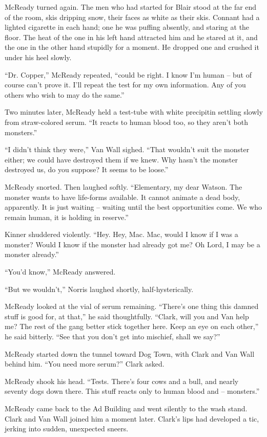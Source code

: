\documentclass[letterpaper,openany,12pt]{memoir}		%
\begin{document}
McReady turned again. The men who had started for Blair stood at the far end of
the room, skis dripping snow, their faces as white as their skis. Connant had a
lighted cigarette in each hand; one he was puffing absently, and staring at the
floor. The heat of the one in his left hand attracted him and he stared at it,
and the one in the other hand stupidly for a moment. He dropped one and crushed
it under his heel slowly.

``Dr. Copper,'' McReady repeated, ``could be right. I know I'm human -- but of
course can't prove it. I'll repeat the test for my own information. Any of you
others who wish to may do the same.''

Two minutes later, McReady held a test-tube with white precipitin settling
slowly from straw-colored serum. ``It reacts to human blood too, so they aren't
both monsters.''

``I didn't think they were,'' Van Wall sighed. ``That wouldn't suit the monster
either; we could have destroyed them if we knew. Why hasn't the monster
destroyed us, do you suppose? It seems to be loose.''

McReady snorted. Then laughed softly. ``Elementary, my dear Watson. The monster
wants to have life-forms available. It cannot animate a dead body, apparently.
It is just waiting -- waiting until the best opportunities come. We who remain
human, it is holding in reserve.''

Kinner shuddered violently. ``Hey. Hey, Mac. Mac, would I know if I was a
monster? Would I know if the monster had already got me? Oh Lord, I may be a
monster already.''

``You'd know,'' McReady answered.

``But we wouldn't,'' Norris laughed shortly, half-hysterically.

McReady looked at the vial of serum remaining. ``There's one thing this damned
stuff is good for, at that,'' he said thoughtfully. ``Clark, will you and Van
help me? The rest of the gang better stick together here. Keep an eye on each
other,'' he said bitterly. ``See that you don't get into mischief, shall we
say?''

McReady started down the tunnel toward Dog Town, with Clark and Van Wall behind
him. ``You need more serum?'' Clark asked.

McReady shook his head. ``Tests. There's four cows and a bull, and nearly
seventy dogs down there. This stuff reacts only to human blood and --
monsters.''

McReady came back to the Ad Building and went silently to the wash stand. Clark
and Van Wall joined him a moment later. Clark's lips had developed a tic,
jerking into sudden, unexpected sneers.
\end{document}
